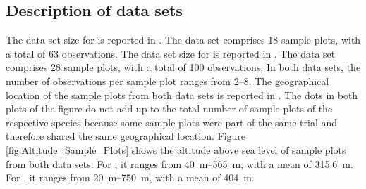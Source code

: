 \subsection{Description of data sets}

The data set size for \beech{} is reported in .  The data set comprises 18 sample plots, with a total of 63 observations.  The data set size for \spruce{} is reported in .  The data set comprises 28 sample plots, with a total of 100 observations.  In both data sets, the number of observations per sample plot ranges from \numrange{2}{8}.  The geographical location of the sample plots from both data sets is reported in .  The dots in both plots of the figure do not add up to the total number of sample plots of the respective species because some sample plots were part of the same trial and therefore shared the same geographical location.
Figure \ref{fig:Altitude_Sample_Plots} shows the altitude above sea level of sample plots from both data sets.  For \beech{}, it ranges from \SIrange{40}{565}{\meter}, with a mean of \SI{315.6}{\meter}.  For \spruce{}, it ranges from \SIrange{20}{750}{\meter}, with a mean of \SI{404}{\meter}.


